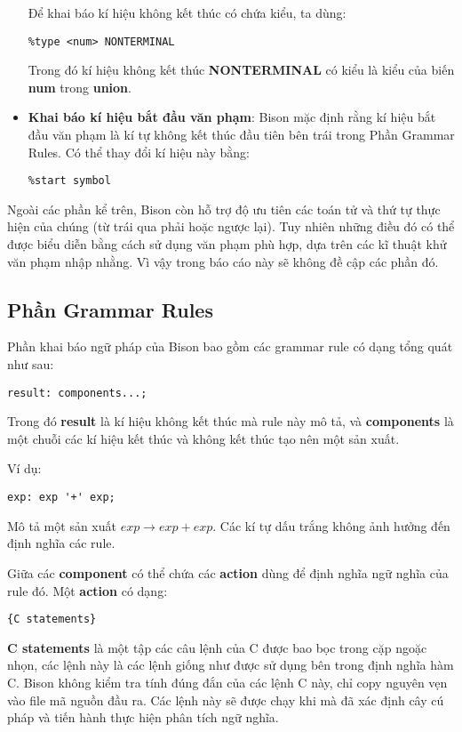 \documentclass[../report.tex]{subfiles}
\begin{document}
\begin{itemize}
Để khai báo kí hiệu không kết thúc có chứa kiểu, ta dùng: 
\begin{lstlisting}
%type <num> NONTERMINAL
\end{lstlisting}
Trong đó kí hiệu không kết thúc \textbf{NONTERMINAL} 
có kiểu là kiểu của biến \textbf{num} trong \textbf{union}. 
\cite{nonterminal-decl}

\item \textbf{Khai báo kí hiệu bắt đầu văn phạm}: 
\cite{start-symbol}
Bison mặc định rằng kí hiệu bắt đầu văn phạm là kí tự không
kết thúc đầu tiên bên trái trong Phần Grammar Rules. 
Có thể thay đổi kí hiệu này bằng: 
\begin{lstlisting}
%start symbol
\end{lstlisting}

\end{itemize}

Ngoài các phần kể trên, Bison còn hỗ trợ độ ưu tiên các toán tử
và thứ tự thực hiện của chúng (từ trái qua phải hoặc ngược lại). 
Tuy nhiên những điều đó có thể được biểu diễn bằng cách sử dụng văn
phạm phù hợp, dựa trên các kĩ thuật khử văn phạm nhập nhằng. 
Vì vậy trong báo cáo này sẽ không đề cập các phần đó. 

\subsection{Phần Grammar Rules}
Phần khai báo ngữ pháp của Bison bao gồm các grammar rule có 
dạng tổng quát như sau: 
\cite{syntax-rules}
\begin{lstlisting}
result: components...;
\end{lstlisting}
Trong đó \textbf{result} là kí hiệu không kết thúc 
mà rule này mô tả, và \textbf{components} là 
một chuỗi các kí hiệu kết thúc và không kết thúc tạo nên một 
sản xuất.

Ví dụ: 
\begin{lstlisting}
exp: exp '+' exp;
\end{lstlisting}
Mô tả một sản xuất $exp \rightarrow exp + exp$.
Các kí tự dấu trắng không ảnh hưởng đến định nghĩa các rule. 

Giữa các \textbf{component} có thể chứa các \textbf{action}
dùng để định nghĩa ngữ nghĩa của rule đó. 
Một \textbf{action} có dạng:
\begin{lstlisting}
{C statements}
\end{lstlisting}
\textbf{C statements} là một tập các câu lệnh của C được bao bọc 
trong cặp ngoặc nhọn, các lệnh này là các lệnh giống như được 
sử dụng bên trong định nghĩa hàm C. 
Bison không kiểm tra tính đúng đắn của các lệnh C này, chỉ copy 
nguyên vẹn vào file mã nguồn đầu ra. Các lệnh này sẽ được 
chạy khi mà đã xác định cây cú pháp và tiến hành thực hiện 
phân tích ngữ nghĩa. 
\end{document}
